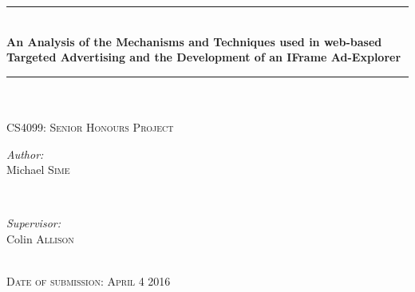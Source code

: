 \documentclass[12pt]{article}
\begin{document}
\begin{titlepage}

\newcommand{\HRule}{\rule{\linewidth}{0.5mm}} %

\center %


\HRule \\[0.4cm]
{ \Huge \bfseries An Analysis of the Mechanisms and Techniques used in web-based Targeted Advertising and the Development of an IFrame Ad-Explorer}\\
\HRule \\[1.5cm]



\\
 


\textsc{\Large CS4099: Senior Honours Project}\\[1cm]


\begin{minipage}{0.4\textwidth}
\begin{flushleft} \large
\emph{Author:}\\
Michael \textsc{Sime} %
\end{flushleft}
\end{minipage}
~
\begin{minipage}{0.4\textwidth}
\begin{flushright} \large
\emph{Supervisor:} \\
Colin \textsc{Allison} %
\end{flushright}
\end{minipage}\\ [0.75cm]



\textsc{Date of submission: April 4 2016}\\

\vfill %

\end{titlepage}
\end{document}
